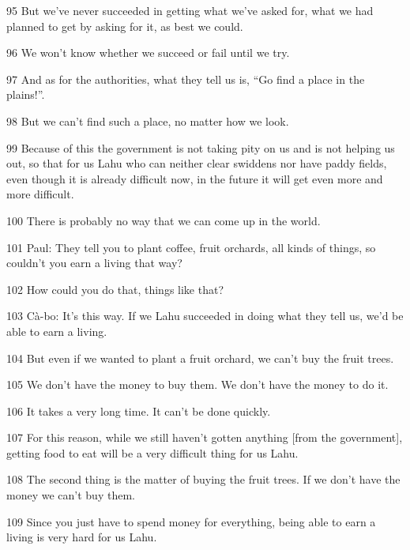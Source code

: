 {95 But we've never succeeded in getting what we've asked for, what we had
planned to get by asking for it, as best we could.}

{96 We won't know whether we succeed or fail until we try.}

{97 And as for the authorities, what they tell us is, ``Go find a place
in the plains!''.}

{98 But we can't find such a place, no matter how we look.}

{99 Because of this the government is not taking pity on us and is not helping
us out, so that for us Lahu who can neither clear swiddens nor have paddy fields,
even though it is already difficult now, in the future it will get even more and
more difficult.}

{100 There is probably no way that we can come up in the world.}

{101 Paul: They tell you to plant coffee, fruit orchards, all kinds of things,
so couldn't you earn a living that way?}

{102 How could you do that, things like that?}

{103 Cà-bo: It's this way. If we Lahu succeeded in doing what they tell
us, we'd be able to earn a living.}

{104 But even if we wanted to plant a fruit orchard, we can't buy the fruit
trees.}

{105 We don't have the money to buy them. We don't have the money to do
it.}

{106 It takes a very long time. It can't be done quickly.}

{107 For this reason, while we still haven't gotten anything [from the government],
getting food to eat will be a very difficult thing for us Lahu.}

{108 The second thing is the matter of buying the fruit trees. If we don't
have the money we can't buy them.}

{109 Since you just have to spend money for everything, being able to earn
a living is very hard for us Lahu.}

